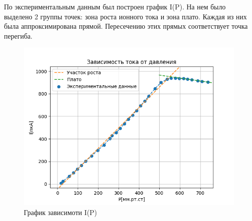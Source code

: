 \documentclass[a4paper,12pt]{article} %
\begin{document}
            По экспериментальным данным был построен график I(P). 
            На нем было выделено 2 группы точек: зона роста ионного тока и зона плато. 
            Каждая из них была аппроксимирована прямой. 
            Пересечению этих прямых соответствует точка перегиба.\par
            \begin{figure}[h!]
                \centering
                \includegraphics[width=18cm]{img/Graph1.PNG}
                \caption{График зависимоти I(P)}
                \label{graph1}
            \end{figure}
    \newpage
\end{document}
